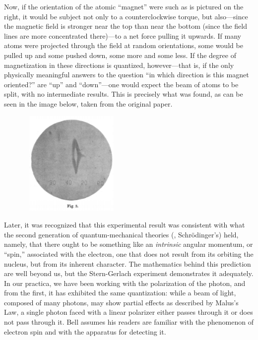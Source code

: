 Now, if the orientation of the atomic ``magnet'' were such as is pictured on the right, it would be subject not only to a counterclockwise torque, but also---since the magnetic field is stronger near the top than near the bottom (since the field lines are more concentrated there)---to a net force pulling it upwards. If many atoms were projected through the field at random orientations, some would be pulled up and some pushed down, some more and some less. If the degree of magnetization in these directions is quantized, however---that is, if the only physically meaningful answers to the question ``in which direction is this magnet oriented?'' are ``up'' and ``down''---one would expect the beam of atoms to be split, with no intermediate results. This is precisely what was found, as can be seen in the image below, taken from the original paper.

\begin{figure}[h]
  \begin{center}
    \includegraphics[width=2.00000in,height=2.00000in]{images/17_bell/result.png}
  \end{center}
\end{figure}

Later, it was recognized that this experimental result was consistent with what the second generation of quantum-mechanical theories (\eg, Schr\"odinger's) held, namely, that there ought to be something like an \emph{intrinsic} angular momentum, or ``spin,'' associated with the electron, one that does not result from its orbiting the nucleus, but from its inherent character. The mathematics behind this prediction are well beyond us, but the Stern-Gerlach experiment demonstrates it adequately. In our practica, we have been working with the polarization of the photon, and from the first, it has exhibited the same quantization: while a beam of light, composed of many photons, may show partial effects as described by Malus's Law, a single photon faced with a linear polarizer either passes through it or does not pass through it. Bell assumes his readers are familiar with the phenomenon of electron spin and with the apparatus for detecting it.

